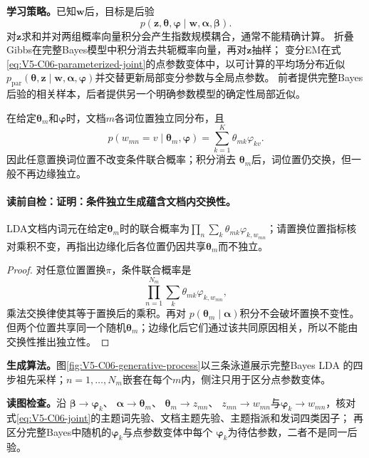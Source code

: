 \label{struct:V5-C06-CH09}
\textbf{学习策略。}已知$\boldsymbol w$后，目标是后验
\[
p(\boldsymbol z,\boldsymbol\theta,\boldsymbol\varphi
\mid\boldsymbol w,\boldsymbol\alpha,\boldsymbol\beta).
\]
对$\boldsymbol z$求和并对两组概率向量积分会产生指数规模耦合，通常不能精确计算。
折叠Gibbs在完整Bayes模型中积分消去共轭概率向量，再对$\boldsymbol z$抽样；
变分EM在式\eqref{eq:V5-C06-parameterized-joint}的点参数变体中，以可计算的平均场分布近似
$p_{\mathrm{par}}(\boldsymbol\theta,\boldsymbol z\mid\boldsymbol w,
\boldsymbol\alpha,\boldsymbol\varphi)$并交替更新局部变分参数与全局点参数。
前者提供完整Bayes后验的相关样本，后者提供另一个明确参数模型的确定性局部近似。

\begin{proposition}[条件独立生成蕴含文档内交换性]\label{prop:V5-C06-exchangeable}
在给定$\boldsymbol\theta_m$和$\boldsymbol\varphi$时，文档$m$各词位置独立同分布，且
\[
p(w_{mn}=v\mid\boldsymbol\theta_m,\boldsymbol\varphi)
=\sum_{k=1}^{K}\theta_{mk}\varphi_{kv}.
\]
因此任意置换词位置不改变条件联合概率；积分消去
$\boldsymbol\theta_m$后，词位置仍交换，但一般不再边缘独立。
\end{proposition}
\paragraph{读前自检：证明：条件独立生成蕴含文档内交换性。}LDA文档内词元在给定$\boldsymbol\theta_m$时的联合概率为$\prod_n\sum_k\theta_{mk}\varphi_{k,w_{mn}}$；请置换位置指标核对乘积不变，再指出边缘化后各位置仍因共享$\boldsymbol\theta_m$而不独立。\par

\begin{proof}
对任意位置置换$\pi$，条件联合概率是
\[
\prod_{n=1}^{N_m}\sum_k\theta_{mk}\varphi_{k,w_{mn}},
\]
乘法交换律使其等于置换后的乘积。再对
$p(\boldsymbol\theta_m\mid\boldsymbol\alpha)$积分不会破坏置换不变性。
但两个位置共享同一个随机$\boldsymbol\theta_m$；边缘化后它们通过该共同原因相关，所以不能由交换性推出独立性。
\end{proof}

\label{struct:V5-C06-CH10}
\textbf{生成算法。}图\ref{fig:V5-C06-generative-process}以三条泳道展示完整Bayes LDA 的四步祖先采样；$n=1,\ldots,N_m$嵌套在每个$m$内，侧注只用于区分点参数变体。

\FloatBarrier
\noindent\textbf{读图检查。}沿
$\boldsymbol\beta\to\boldsymbol\varphi_k$、
$\boldsymbol\alpha\to\boldsymbol\theta_m$、
$\boldsymbol\theta_m\to z_{mn}$、
$z_{mn}\to w_{mn}$与$\boldsymbol\varphi_k\to w_{mn}$，核对
式\eqref{eq:V5-C06-joint}的主题词先验、文档主题先验、主题指派和发词四类因子；
再区分完整Bayes中随机的$\boldsymbol\varphi_k$与点参数变体中每个
$\boldsymbol\varphi_k$为待估参数，二者不是同一后验。

